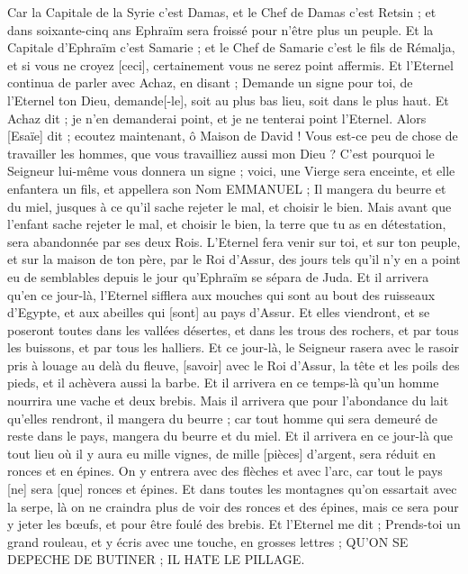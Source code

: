 \begin{multicols}{2}
Car la Capitale de la Syrie c'est Damas, et le Chef de Damas c'est Retsin ; et dans soixante-cinq ans Ephraïm sera froissé pour n'être plus un peuple.
Et la Capitale d'Ephraïm c'est Samarie ; et le Chef de Samarie c'est le fils de Rémalja, et si vous ne croyez [ceci], certainement vous ne serez point affermis.
Et l'Eternel continua de parler avec Achaz, en disant ;
Demande un signe pour toi, de l'Eternel ton Dieu, demande[-le], soit au plus bas lieu, soit dans le plus haut.
Et Achaz dit ; je n'en demanderai point, et je ne tenterai point l'Eternel.
Alors [Esaïe] dit ; ecoutez maintenant, ô Maison de David ! Vous est-ce peu de chose de travailler les hommes, que vous travailliez aussi mon Dieu ?
C'est pourquoi le Seigneur lui-même vous donnera un signe ; voici, une Vierge sera enceinte, et elle enfantera un fils, et appellera son Nom EMMANUEL ;
Il mangera du beurre et du miel, jusques à ce qu'il sache rejeter le mal, et choisir le bien.
Mais avant que l'enfant sache rejeter le mal, et choisir le bien, la terre que tu as en détestation, sera abandonnée par ses deux Rois.
L'Eternel fera venir sur toi, et sur ton peuple, et sur la maison de ton père, par le Roi d'Assur, des jours tels qu'il n'y en a point eu de semblables depuis le jour qu'Ephraïm se sépara de Juda.
Et il arrivera qu'en ce jour-là, l'Eternel sifflera aux mouches qui sont au bout des ruisseaux d'Egypte, et aux abeilles qui [sont] au pays d'Assur.
Et elles viendront, et se poseront toutes dans les vallées désertes, et dans les trous des rochers, et par tous les buissons, et par tous les halliers.
Et ce jour-là, le Seigneur rasera avec le rasoir pris à louage au delà du fleuve, [savoir] avec le Roi d'Assur, la tête et les poils des pieds, et il achèvera aussi la barbe.
Et il arrivera en ce temps-là qu'un homme nourrira une vache et deux brebis.
Mais il arrivera que pour l'abondance du lait qu'elles rendront, il mangera du beurre ; car tout homme qui sera demeuré de reste dans le pays, mangera du beurre et du miel.
Et il arrivera en ce jour-là que tout lieu où il y aura eu mille vignes, de mille [pièces] d'argent, sera réduit en ronces et en épines.
On y entrera avec des flèches et avec l'arc, car tout le pays [ne] sera [que] ronces et épines.
Et dans toutes les montagnes qu'on essartait avec la serpe, là on ne craindra plus de voir des ronces et des épines, mais ce sera pour y jeter les bœufs, et pour être foulé des brebis.
\VerseOne{}Et l'Eternel me dit ; Prends-toi un grand rouleau, et y écris avec une touche, en grosses lettres ; QU'ON SE DEPECHE DE BUTINER ; IL HATE LE PILLAGE.

\end{multicols}
